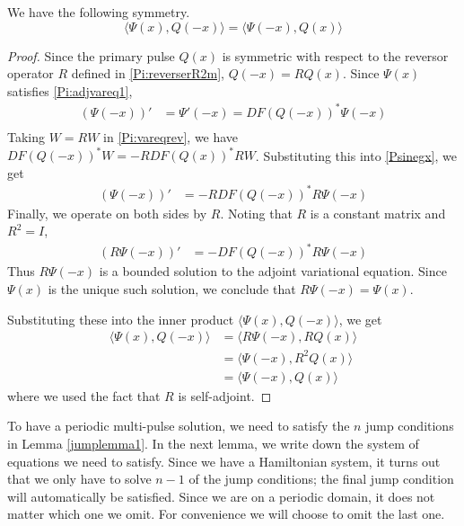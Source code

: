 \documentclass[thesis.tex]{subfiles}
\begin{document}
\begin{lemma}\label{IPsymmlemma}
We have the following symmetry.
\begin{equation}\label{IPsymm}
\langle \Psi(x), Q(-x) \rangle = \langle \Psi(-x), Q(x) \rangle
\end{equation}
\begin{proof}
Since the primary pulse $Q(x)$ is symmetric with respect to the reversor operator $R$ defined in \eqref{Pi:reverserR2m}, $Q(-x) = RQ(x)$. Since $\Psi(x)$ satisfies \eqref{Pi:adjvareq1},
\begin{align}\label{Psinegx}
(\Psi(-x))' &= \Psi'(-x) = DF(Q(-x))^* \Psi(-x) \\
\end{align}
Taking $W = RW$ in \eqref{Pi:vareqrev}, we have $DF(Q(-x))^* W = -R DF(Q(x))^* R W$. Substituting this into \eqref{Psinegx}, we get
\begin{align*}
(\Psi(-x))' &= -R DF(Q(-x))^* R \Psi(-x)
\end{align*}
Finally, we operate on both sides by $R$. Noting that $R$ is a constant matrix and $R^2 = I$, 
\begin{align*}
(R \Psi(-x))' &= -DF(Q(-x))^* R \Psi(-x)
\end{align*}
Thus $R \Psi(-x)$ is a bounded solution to the adjoint variational equation. Since $\Psi(x)$ is the unique such solution, we conclude that $R \Psi(-x) = \Psi(x)$.

Substituting these into the inner product $\langle \Psi(x), Q(-x) \rangle$, we get
\begin{align*}
\langle \Psi(x), Q(-x) \rangle
&= \langle R \Psi(-x), R Q(x) \rangle \\
&= \langle \Psi(-x), R^2 Q(x) \rangle \\
&= \langle \Psi(-x), Q(x) \rangle
\end{align*}
where we used the fact that $R$ is self-adjoint.
\end{proof}
\end{lemma}

To have a periodic multi-pulse solution, we need to satisfy the $n$ jump conditions in Lemma \ref{jumplemma1}. In the next lemma, we write down the system of equations we need to satisfy. Since we have a Hamiltonian system, it turns out that we only have to solve $n-1$ of the jump conditions; the final jump condition will automatically be satisfied. Since we are on a periodic domain, it does not matter which one we omit. For convenience we will choose to omit the last one.
\end{document}
